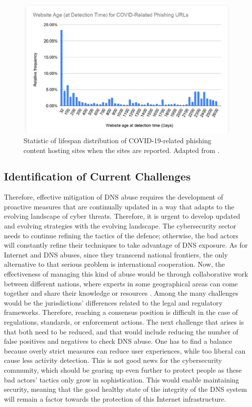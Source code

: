 \captionsetup{font= footnotesize}
\begin{figure}[H]
    \centering
    \includegraphics[width=0.5\linewidth]{background/AgeCovid.png}
    \caption{Statistic of lifespan distribution of COVID-19-related phishing content hosting sites when the sites are reported. Adapted from \cite{Unit42AtricleCovidPhishing2021}.}
    \label{fig:figSixteen}
\end{figure}

\subsection{Identification of Current Challenges}


Therefore, effective mitigation of DNS abuse requires the development of proactive measures that are continually updated in a way that adapts to the evolving landscape of cyber threats. Therefore, it is urgent to develop updated and evolving strategies with the evolving landscape. The cybersecurity sector needs to continue refining the tactics of the defence; otherwise, the bad actors will constantly refine their techniques to take advantage of DNS exposure. As for Internet and DNS abuses, since they transcend national frontiers, the only alternative to that serious problem is international cooperation. Now, the effectiveness of managing this kind of abuse would be through collaborative work between different nations, where experts in some geographical areas can come together and share their knowledge or resources \cite{altulaihan2022cybersecurity}. Among the many challenges would be the jurisdictions' differences related to the legal and regulatory frameworks. Therefore, reaching a consensus position is difficult in the case of regulations, standards, or enforcement actions. The next challenge that arises is that both need to be reduced, and that would include reducing the number of false positives and negatives to check DNS abuse. One has to find a balance because overly strict measures can reduce user experiences, while too liberal can cause less activity detection. This is not good news for the cybersecurity community, which should be gearing up even further to protect people as these bad actors' tactics only grow in sophistication. This would enable maintaining security, meaning that the good healthy state of the integrity of the DNS system will remain a factor towards the protection of this Internet infrastructure.


